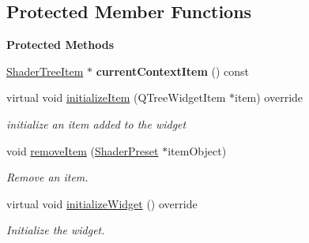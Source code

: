 \subsection*{Protected Member Functions}
\begin{Indent}\textbf{ Protected Methods}\par
\begin{DoxyCompactItemize}
\item 
\mbox{\label{classrev_1_1_view_1_1_shader_tree_widget_a050abc3e1e7312ebee238a94c5e0d3b0}} 
\mbox{\hyperlink{classrev_1_1_view_1_1_shader_tree_item}{Shader\+Tree\+Item}} $\ast$ {\bfseries current\+Context\+Item} () const
\item 
\mbox{\label{classrev_1_1_view_1_1_shader_tree_widget_af0630b13799b0438f0ac74ef0b88effa}} 
virtual void \mbox{\hyperlink{classrev_1_1_view_1_1_shader_tree_widget_af0630b13799b0438f0ac74ef0b88effa}{initialize\+Item}} (Q\+Tree\+Widget\+Item $\ast$item) override
\begin{DoxyCompactList}\small\item\em initialize an item added to the widget \end{DoxyCompactList}\item 
\mbox{\label{classrev_1_1_view_1_1_shader_tree_widget_a04cb2fc58850af39329c473575951933}} 
void \mbox{\hyperlink{classrev_1_1_view_1_1_shader_tree_widget_a04cb2fc58850af39329c473575951933}{remove\+Item}} (\mbox{\hyperlink{classrev_1_1_shader_preset}{Shader\+Preset}} $\ast$item\+Object)
\begin{DoxyCompactList}\small\item\em Remove an item. \end{DoxyCompactList}\item 
\mbox{\label{classrev_1_1_view_1_1_shader_tree_widget_a41e672d8ea03625838ed056199685f72}} 
virtual void \mbox{\hyperlink{classrev_1_1_view_1_1_shader_tree_widget_a41e672d8ea03625838ed056199685f72}{initialize\+Widget}} () override
\begin{DoxyCompactList}\small\item\em Initialize the widget. \end{DoxyCompactList}\end{DoxyCompactItemize}
\end{Indent}
